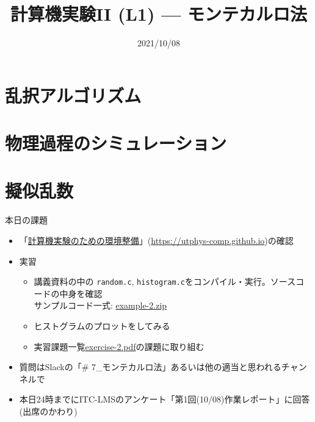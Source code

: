 \documentclass[10pt,dvipdfmx]{beamer}
\title{計算機実験II (L1) --- モンテカルロ法}
\date{2021/10/08}
\begin{document}
\begin{frame}
  \titlepage
  \tableofcontents
\end{frame}


% 

\section{乱択アルゴリズム}






\section{物理過程のシミュレーション}




\section{擬似乱数}










\begin{frame}[t]{本日の課題}
  \begin{itemize}
  \item 「\href{https://utphys-comp.github.io}{計算機実験のための環境整備}」({\small \href{https://utphys-comp.github.io}{https://utphys-comp.github.io}})の確認
  \item 実習
    \begin{itemize}
    \item 講義資料の中の {\tt random.c}, {\tt histogram.c}をコンパイル・実行。ソースコードの中身を確認 \\
      サンプルコード一式: \href{https://github.com/todo-group/ComputerExperiments/releases/tag/2021a-computer2}{example-2.zip}
    \item ヒストグラムのプロットをしてみる
    \item 実習課題一覧\href{https://github.com/todo-group/ComputerExperiments/releases/tag/2021a-computer2}{exercise-2.pdf}の課題に取り組む
    \end{itemize}
  \item 質問はSlackの「\# 7\_モンテカルロ法」あるいは他の適当と思われるチャンネルで
  \item 本日24時までにITC-LMSのアンケート「第1回(10/08)作業レポート」に回答(出席のかわり)
  \end{itemize}
\end{frame}
\end{document}
